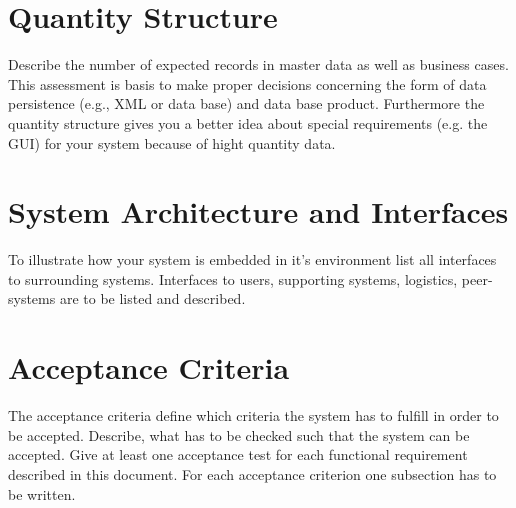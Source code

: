 \documentclass[12pt]{article}
\theoremstyle{definition}
\newenvironment{explanation}{%
   \setlength{\parindent}{0pt}
   \itshape
   \color{blue}
}{}
\begin{document}
\section{Quantity Structure}
\begin{explanation}
Describe the number of expected records in master data as well as business cases. This assessment is basis to make proper decisions concerning the form of data persistence (e.g., XML or data base) and data base product. Furthermore the quantity structure gives you a better idea about special requirements (e.g. the GUI) for your system because of hight quantity data.
\end{explanation}

\pagebreak
\section{System Architecture and Interfaces}
\begin{explanation}
To illustrate how your system is embedded in it’s environment list all interfaces to surrounding systems. Interfaces to users, supporting systems, logistics, peer-systems are to be listed and described.
\end{explanation}

\pagebreak
\section{Acceptance Criteria}
\begin{explanation}
The acceptance criteria define which criteria the system has to fulfill in order to be accepted. Describe, what has to be checked such that the system can be accepted. Give at least one acceptance test for each functional requirement described in this document. For each acceptance criterion one subsection has to be written.
\end{explanation}
\end{document}
